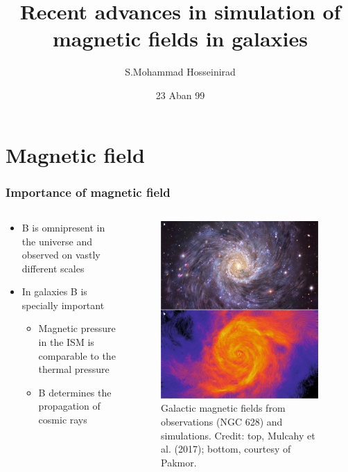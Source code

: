 \documentclass[10pt,aspectratio=169]{beamer}
\title[Recent advances in simulation of B in galaxies]{Recent advances in simulation of magnetic fields in galaxies}
\author[S.Mohammad Hosseinirad]
{S.Mohammad Hosseinirad} %
\institute[FUM]{Ferdowsi Univ. of Mashhad\\ Journal club meeting}
\date{23 Aban 99}
\begin{document}
\begin{frame}
        \titlepage
\end{frame}

\section{Magnetic field}
\begin{frame}
\frametitle{Importance of magnetic field}
	\begin{columns}
		\begin{column}{0.55\textwidth}
			\begin{itemize}%
				\item B is omnipresent in the universe and observed on vastly different scales
				\item In galaxies B is specially important
				\begin{itemize}
					\item Magnetic pressure in the ISM is comparable to the thermal pressure
					\item B determines the propagation of cosmic rays
				\end{itemize}
			\end{itemize}
		\end{column}
		\begin{column}{0.45\textwidth}
			\begin{figure}
				\includegraphics[width=6cm,trim=40 50 5 30,clip]{./images/1.png}
				\caption{Galactic magnetic fields from observations (NGC 628) and simulations. Credit: top, Mulcahy et al. (2017); bottom, courtesy of Pakmor.}
			\end{figure}
		\end{column}
	\end{columns}
\end{frame}
\end{document}
